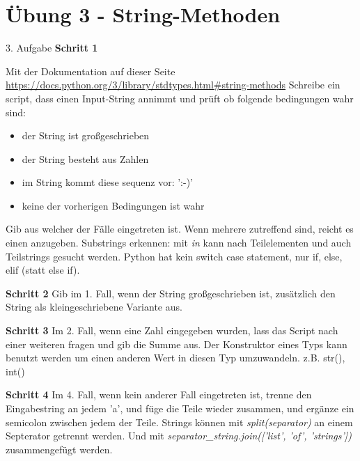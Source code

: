 \section{Übung 3 - String-Methoden}

\begin{frame}{3. Aufgabe}
	\textbf{Schritt 1}
	
	Mit der Dokumentation auf dieser Seite
	\href{https://docs.python.org/3/library/stdtypes.html\#string-methods}{https://docs.python.org/3/library/stdtypes.html\#string-methods}
	Schreibe ein script, dass einen Input-String annimmt und prüft ob folgende bedingungen wahr sind:
	
	\begin{itemize}
		\item[(1.)] der String ist großgeschrieben
		\item[(2.)] der String besteht aus Zahlen
		\item[(3.)] im String kommt diese sequenz vor: ':-)'
		\item[(4.)] keine der vorherigen Bedingungen ist wahr
	\end{itemize}
	
	Gib aus welcher der Fälle eingetreten ist. Wenn mehrere zutreffend sind, reicht es einen anzugeben. \linebreak
	Substrings erkennen: mit \textit{in} kann nach Teilelementen und auch Teilstrings gesucht werden. \linebreak
	Python hat kein switch case statement, nur if, else, elif (statt else if).
\end{frame}
\begin{frame}
	\textbf{Schritt 2}
	\linebreak
	Gib im 1. Fall, wenn der String großgeschrieben ist, zusätzlich den String als kleingeschriebene Variante aus.
	\linebreak
	
	\textbf{Schritt 3}
	\linebreak
	Im 2. Fall, wenn eine Zahl eingegeben wurden, lass das Script nach einer weiteren fragen und gib die Summe aus.
	\linebreak
	Der Konstruktor eines Typs kann benutzt werden um einen anderen Wert in diesen Typ umzuwandeln. z.B. str(), int()
	\linebreak
\end{frame}
\begin{frame}
	\textbf{Schritt 4}
	\linebreak
	Im 4. Fall, wenn kein anderer Fall eingetreten ist, trenne den Eingabestring an jedem 'a', und füge die Teile wieder zusammen, und ergänze ein semicolon zwischen jedem der Teile.
	\linebreak
	Strings können mit \textit{split(separator)} an einem Septerator getrennt werden.
	\linebreak
	Und mit \textit{separator\_string.join(['list', 'of', 'strings'])} zusammengefügt werden.
\end{frame}



